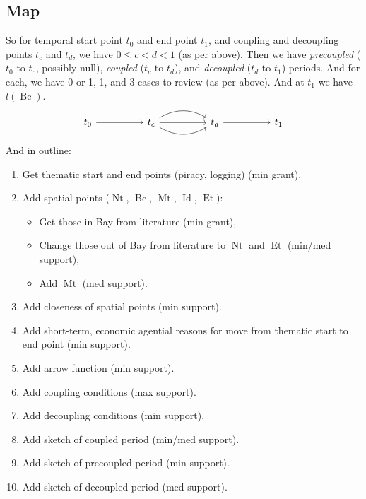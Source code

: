 \documentclass{amsart}
\newcommand{\mention}[1]{\textit{#1}}%
\DeclareMathOperator{\id}{Id}%
\DeclareMathOperator{\mt}{Mt}%
\DeclareMathOperator{\bc}{Bc}%
\DeclareMathOperator{\et}{Et}%
\DeclareMathOperator{\nt}{Nt}%
\theoremstyle{definition}%
\theoremstyle{definition}%
\theoremstyle{remark}%
\begin{document}
\subsection{Map}
\label{ss:map}
So for temporal start point \(t_{0}\) and end point \(t_{1}\), and coupling and decoupling points \(t_{c}\) and \(t_{d}\), we have \(0\leq c<d< 1\) (as per above). %
Then we have \mention{precoupled} (\(t_{0}\) to \(t_{c}\), possibly null), \mention{coupled} (\(t_{c}\) to \(t_{d}\)), and \mention{decoupled} (\(t_{d}\) to \(t_{1}\)) periods. And for each, we have 0 or 1, 1, and 3 cases to review (as per above). And at \(t_{1}\) we have \(l(\bc)\).
%
\begin{equation}
\label{}
\begin{tikzcd}[sep=huge]
t_{0} \rar &t_{c} \rar \rar[bend left] \rar[bend right] &t_{d} \rar &t_{1}
\end{tikzcd}
\end{equation}
%
And in outline:
\begin{enumerate}
\item Get thematic start and end points (piracy, logging) (min grant).
\item Add spatial points (\(\nt\), \(\bc\), \(\mt\), \(\id\), \(\et\)):
	\begin{itemize}
	\item Get those in Bay from literature (min grant),
	\item Change those out of Bay from literature to \(\nt\) and \(\et\) (min/med support),%
	\item Add \(\mt\) (med support).
	\end{itemize}
\item Add closeness of spatial points (min support).
\item Add short-term, economic agential reasons for move from thematic start to end point (min support).
\item Add arrow function (min support).%
\item Add coupling conditions (max support).%
\item Add decoupling conditions (min support).
\item Add sketch of coupled period (min/med support).
\item Add sketch of precoupled period (min support).
\item Add sketch of decoupled period (med support).
\end{enumerate}
%
%
\end{document}
